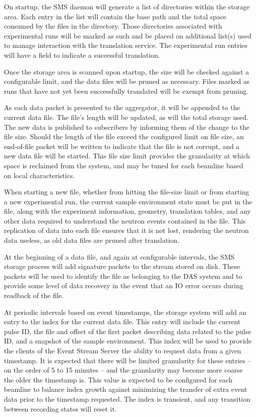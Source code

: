 On startup, the SMS daemon will generate a list of directories within the
storage area. Each entry in the list will contain the base path and the total
space consumed by the files in the directory. Those directories associated with
experimental runs will be marked as such and be placed on additional list(s)
used to manage interaction with the translation service. The experimental run
entries will have a field to indicate a successful translation.

Once the storage area is scanned upon startup, the size will be checked
against a configurable limit, and the data files will be pruned as necessary.
Files marked as runs that have not yet been successfully translated will be
exempt from pruning.

As each data packet is presented to the aggregator, it will be appended to the
current data file. The file's length will be updated, as will the total storage
used. The new data is published to subscribers by informing them of the change
to the file size. Should the length of the file exceed the configured limit on
file size, an end-of-file packet will be written to indicate that the file is
not corrupt, and a new data file will be started. This file size limit provides
the granularity at which space is reclaimed from the system, and may be tuned
for each beamline based on local characteristics.

When starting a new file, whether from hitting the file-size limit or from
starting a new experimental run, the current sample environment state must be 
put in the file, along with the experiment information, geometry, translation
tables, and any other data required to understand the neutron events contained
in the file. This replication of data into each file ensures that it is not
lost, rendering the neutron data useless, as old data files are pruned after
translation.

At the beginning of a data file, and again at configurable intervals, the SMS
storage process will add signature packets to the stream stored on disk. These
packets will be used to identify the file as belonging to the DAS system and to
provide some level of data recovery in the event that an IO error occurs during
readback of the file.

At periodic intervals based on event timestamps, the storage system will add an
entry to the index for the current data file. This entry will include the
current pulse ID, the file and offset of the first packet describing data
related to the pulse ID, and a snapshot of the sample environment. This index
will be used to provide the clients of the Event Stream Server the ability to
request data from a given timestamp. It is expected that there will be limited
granularity for these entries -- on the order of 5 to 15 minutes -- and the
granularity may become more coarse the older the timestamp is. This value is
expected to be configured for each beamline to balance index growth against
minimizing the transfer of extra event data prior to the timestamp requested.
The index is transient, and any transition between recording states will reset
it.

